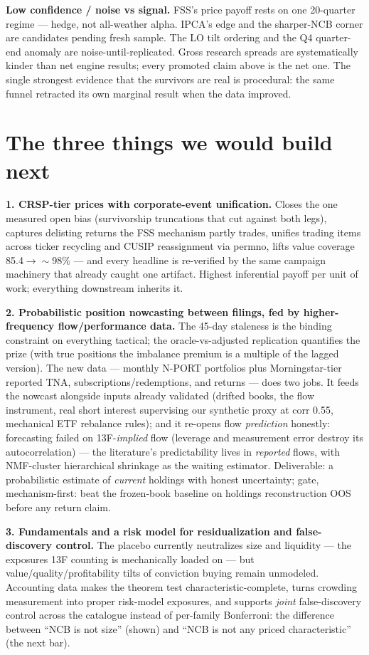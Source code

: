 \documentclass[10pt]{article}
\begin{document}
\textbf{Low confidence / noise vs signal.} FSS's price payoff rests
on one 20-quarter regime --- hedge, not all-weather alpha. IPCA's
edge and the sharper-NCB corner are candidates pending fresh sample.
The LO tilt ordering and the Q4 quarter-end anomaly are
noise-until-replicated. Gross research spreads are systematically
kinder than net engine results; every promoted claim above is the
net one. The single strongest evidence that the survivors are real
is procedural: the same funnel retracted its own marginal result
when the data improved.

\section{The three things we would build next}

\textbf{1. CRSP-tier prices with corporate-event unification.}
Closes the one measured open bias (survivorship truncations that cut
against both legs), captures delisting returns the FSS mechanism
partly trades, unifies trading items across ticker recycling and
CUSIP reassignment via permno, lifts value coverage
85.4$\to\sim$98\% --- and every headline is re-verified by the same
campaign machinery that already caught one artifact. Highest
inferential payoff per unit of work; everything downstream inherits
it.

\textbf{2. Probabilistic position nowcasting between filings, fed by
higher-frequency flow/performance data.} The 45-day staleness is the
binding constraint on everything tactical; the oracle-vs-adjusted
replication quantifies the prize (with true positions the imbalance
premium is a multiple of the lagged version). The new data ---
monthly N-PORT portfolios plus Morningstar-tier reported TNA,
subscriptions/redemptions, and returns --- does two jobs. It feeds
the nowcast alongside inputs already validated (drifted books, the
flow instrument, real short interest supervising our synthetic proxy
at corr 0.55, mechanical ETF rebalance rules); and it re-opens flow
\emph{prediction} honestly: forecasting failed on 13F-\emph{implied}
flow (leverage and measurement error destroy its autocorrelation)
--- the literature's predictability lives in \emph{reported} flows,
with NMF-cluster hierarchical shrinkage as the waiting estimator.
Deliverable: a probabilistic estimate of \emph{current} holdings
with honest uncertainty; gate, mechanism-first: beat the frozen-book
baseline on holdings reconstruction OOS before any return claim.

\textbf{3. Fundamentals and a risk model for residualization and
false-discovery control.} The placebo currently neutralizes size and
liquidity --- the exposures 13F counting is mechanically loaded on
--- but value/quality/profitability tilts of conviction buying
remain unmodeled. Accounting data makes the theorem test
characteristic-complete, turns crowding measurement into proper
risk-model exposures, and supports \emph{joint} false-discovery
control across the catalogue instead of per-family Bonferroni: the
difference between ``NCB is not size'' (shown) and ``NCB is not any
priced characteristic'' (the next bar).
\end{document}

